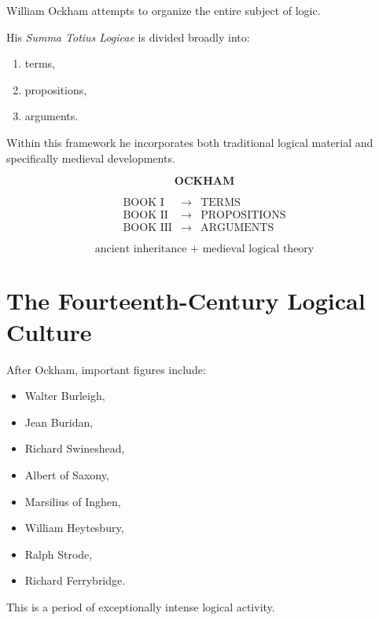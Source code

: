 \documentclass[11pt]{article}
\begin{document}
William Ockham attempts to organize the entire subject of logic.

His \textit{Summa Totius Logicae} is divided broadly into:

\begin{enumerate}
    \item terms,
    \item propositions,
    \item arguments.
\end{enumerate}

Within this framework he incorporates both traditional logical
material and specifically medieval developments.

\begin{whiteboard}
\[
\textbf{OCKHAM}
\]

\[
\begin{array}{lll}
\text{BOOK I} &\rightarrow& \text{TERMS}\\
\text{BOOK II} &\rightarrow& \text{PROPOSITIONS}\\
\text{BOOK III} &\rightarrow& \text{ARGUMENTS}
\end{array}
\]

\[
\boxed{\text{ancient inheritance + medieval logical theory}}
\]
\end{whiteboard}

\section{The Fourteenth-Century Logical Culture}

After Ockham, important figures include:

\begin{itemize}
    \item Walter Burleigh,
    \item Jean Buridan,
    \item Richard Swineshead,
    \item Albert of Saxony,
    \item Marsilius of Inghen,
    \item William Heytesbury,
    \item Ralph Strode,
    \item Richard Ferrybridge.
\end{itemize}

This is a period of exceptionally intense logical activity.
\end{document}
